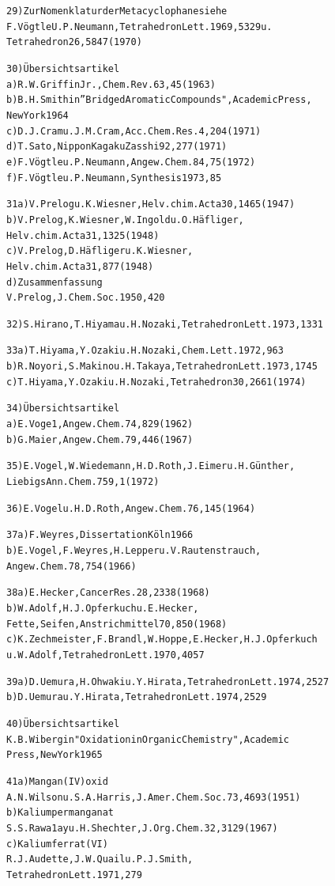\documentclass[a4paper,11pt]{article}
\begin{document}
\begin{alltt}
29)   Zur Nomenklatur der Metacyclophane siehe
      F.Vögtle U. P.Neumann, Tetrahedron Lett. 1969, 5329 u.
      Tetrahedron 26, 5847 (1970)

30)   Übersichtsartikel
   a) R.W.Griffin Jr., Chem.Rev. 63, 45 (1963)
   b) B.H.Smith in ”Bridged Aromatic Compounds", Academic Press,
      New York 1964
   c) D.J.Cram u. J.M.Cram, Acc.Chem.Res. 4, 204 (1971)
   d) T.Sato, Nippon Kagaku Zasshi 92, 277 (1971)
   e) F.Vögtle u. P.Neumann, Angew.Chem. 84, 75 (1972)
   f) F.Vögtle u. P.Neumann, Synthesis 1973, 85

31 a) V.Prelog u. K.Wiesner, Helv.chim.Acta 30, 1465 (1947)
   b) V.Prelog, K.Wiesner, W.Ingold u. O.Häfliger,
      Helv.chim.Acta 31, 1325 (1948)
   c) V.Prelog, D.Häfliger u. K.Wiesner,
      Helv.chim.Acta 31, 877 (1948)
   d) Zusammenfassung
      V.Prelog, J.Chem.Soc. 1950, 420

 32)  S.Hirano, T.Hiyama u. H.Nozaki, Tetrahedron Lett. 1973, 1331
\newpage
{}


33 a) T.Hiyama, Y.Ozaki u. H.Nozaki, Chem.Lett. 1972, 963
   b) R.Noyori, S.Makino u. H.Takaya, Tetrahedron Lett. 1973, 1745
   c) T.Hiyama, Y.Ozaki u. H.Nozaki, Tetrahedron 30, 2661 (1974)

34)   Übersichtsartikel
   a) E.Voge1, Angew.Chem. 74, 829 (1962)
   b) G.Maier, Angew.Chem. 79, 446 (1967)

35)   E.Vogel, W.Wiedemann, H.D.Roth, J.Eimer u. H.Günther,
      Liebigs Ann.Chem. 759, 1 (1972)

36)   E.Vogel u. H.D.Roth, Angew.Chem. 76, 145 (1964)

37 a) F.Weyres, Dissertation Köln 1966
   b) E.Vogel, F.Weyres, H.Lepper u. V.Rautenstrauch,
      Angew.Chem. 78, 754 (1966)

38 a) E.Hecker, Cancer Res. 28, 2338 (1968)
   b) W.Adolf, H.J.Opferkuch u. E.Hecker,
      Fette,Seifen,Anstrichmittel 70, 850 (1968)
   c) K.Zechmeister, F.Brandl, W.Hoppe, E.Hecker, H.J.Opferkuch
      u. W.Adolf, Tetrahedron Lett. 1970, 4057

39 a) D.Uemura, H.Ohwaki u. Y.Hirata, Tetrahedron Lett. 1974, 2527
   b) D.Uemura u. Y.Hirata, Tetrahedron Lett. 1974, 2529

40)   Übersichtsartikel
      K.B.Wiberg in "Oxidation in Organic Chemistry", Academic
      Press, New York 1965

41 a) Mangan(IV)oxid
      A.N.Wilson u. S.A.Harris, J.Amer.Chem.Soc. 73, 4693 (1951)
   b) Kaliumpermanganat
      S.S.Rawa1ay u. H.Shechter, J.Org.Chem. 32, 3129 (1967)
   c) Kaliumferrat(VI)
      R.J.Audette, J.W.Quail u. P.J.Smith,
      Tetrahedron Lett. 1971, 279


\end{alltt}
\end{document}
